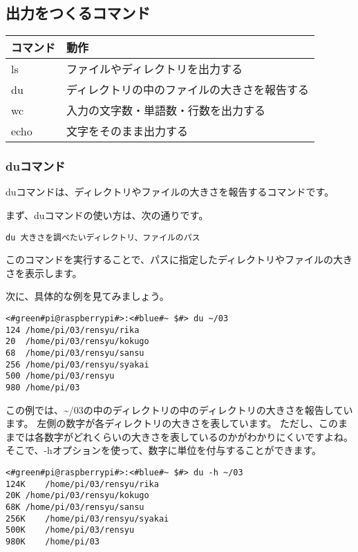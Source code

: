\subsection{出力をつくるコマンド}
\begin{tabular}{ll}
    コマンド & 動作 \\ \hline
    ls & ファイルやディレクトリを出力する \\
    du & ディレクトリの中のファイルの大きさを報告する\\
    wc & 入力の文字数・単語数・行数を出力する\\
    echo & 文字をそのまま出力する\\ \hline
\end{tabular}

\subsubsection{duコマンド}
duコマンドは、ディレクトリやファイルの大きさを報告するコマンドです。

まず、duコマンドの使い方は、次の通りです。

\begin{lstlisting}[caption=duコマンドの使い方, label=du_usage]
du 大きさを調べたいディレクトリ、ファイルのパス
\end{lstlisting}

このコマンドを実行することで、パスに指定したディレクトリやファイルの大きさを表示します。

次に、具体的な例を見てみましょう。

\begin{lstlisting}[caption=duコマンドの実行例, label=du_example]
<#green#pi@raspberrypi#>:<#blue#~ $#> du ~/03
124	/home/pi/03/rensyu/rika
20	/home/pi/03/rensyu/kokugo
68	/home/pi/03/rensyu/sansu
256	/home/pi/03/rensyu/syakai
500	/home/pi/03/rensyu
980	/home/pi/03
\end{lstlisting}

この例では、\textasciitilde/03の中のディレクトリの中のディレクトリの大きさを報告しています。
左側の数字が各ディレクトリの大きさを表しています。
ただし、このままでは各数字がどれくらいの大きさを表しているのかがわかりにくいですよね。
そこで、-hオプションを使って、数字に単位を付与することができます。

\begin{lstlisting}[caption=du -hの実行例, label=du_example]
<#green#pi@raspberrypi#>:<#blue#~ $#> du -h ~/03
124K	/home/pi/03/rensyu/rika
20K	/home/pi/03/rensyu/kokugo
68K	/home/pi/03/rensyu/sansu
256K	/home/pi/03/rensyu/syakai
500K	/home/pi/03/rensyu
980K	/home/pi/03
\end{lstlisting}

